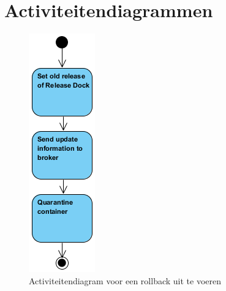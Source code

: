 \chapter{Activiteitendiagrammen}\label{sec:flowcharts}
\begin{figure}[!ht]
\centering
\includegraphics[scale=0.9]{afbeelding/flowcharts/rollback.png}
\caption{Activiteitendiagram voor een rollback uit te voeren}
\label{fig:flow:rollback}
\end{figure}

